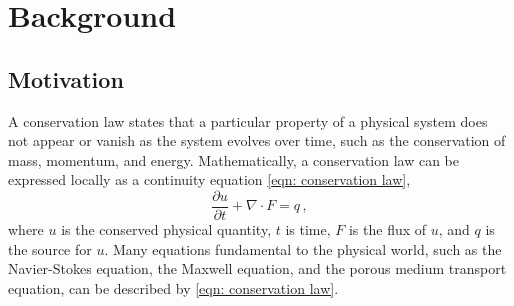 
\chapter{Background}
\label{chap 1}

\section{Motivation}
\label{sec: motivation}
A conservation law states that a particular property of a physical system does not
appear or vanish as the system evolves over time, such as the conservation of mass, momentum, and energy. 
Mathematically, a conservation law can be expressed locally as a continuity equation
\eqref{eqn: conservation law},
\begin{equation}
    \frac{\partial u}{\partial t} + \nabla \cdot F = q\,,
    \label{eqn: conservation law}
\end{equation}
where $u$ is the conserved physical quantity, $t$ is time, $F$ is the flux of $u$, and $q$
is the source for $u$. Many equations fundamental to the physical world, such as the Navier-Stokes equation,
the Maxwell equation, and the porous medium transport equation, can be described by \eqref{eqn: conservation law}.\\

